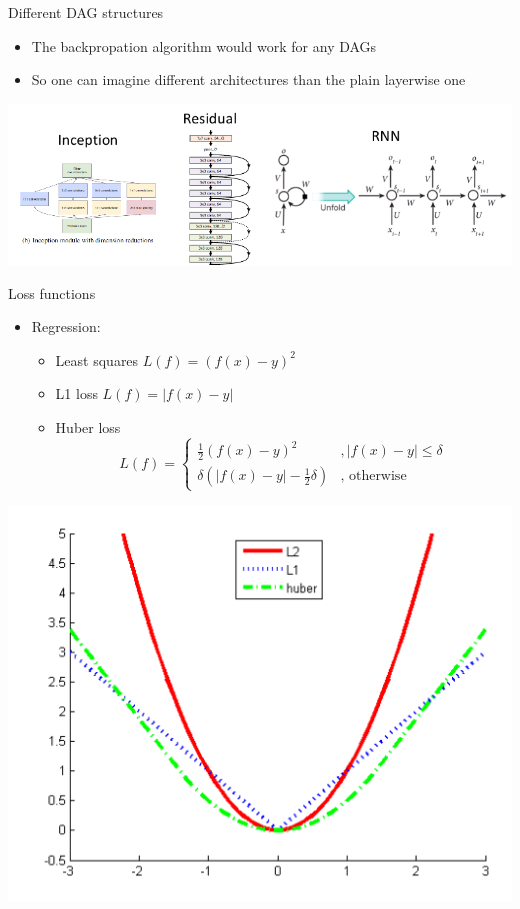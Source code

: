 \documentclass[12pt,notes,mathserif]{beamer}
\providecommand{\tightlist}{%
	\setlength{\itemsep}{0pt}\setlength{\parskip}{0pt}}
\begin{document}
\begin{frame}{Different DAG structures}

\begin{itemize}
\tightlist
\item
  The backpropation algorithm would work for any DAGs
\item
  So one can imagine different architectures than the plain layerwise
  one
\end{itemize}

\begin{center}
    \includegraphics[width=.9\textwidth]{2018-04-14-00-19-13.png}
\end{center}

\end{frame}

\begin{frame}{Loss functions}

\begin{itemize}
\tightlist
\item
  Regression:

  \begin{itemize}
  \tightlist
  \item
    Least squares \(L(f)=(f(x)-y)^{2}\)
  \item
    L1 loss \(L(f)=|f(x)-y|\)
  \item
    Huber loss
    \[L({f})=\begin{cases} \frac{1}{2} (f(x)-y)^2 & , |f(x)-y| \le \delta \\ \delta (|f(x)-y| -\frac{1}{2} \delta ) & \textrm{, otherwise} \end{cases}\]
  \end{itemize}
\end{itemize}

\begin{center}
    \includegraphics[width=.42\textwidth]{2018-04-15-13-10-18.png}
\end{center}

\end{frame}
\end{document}
